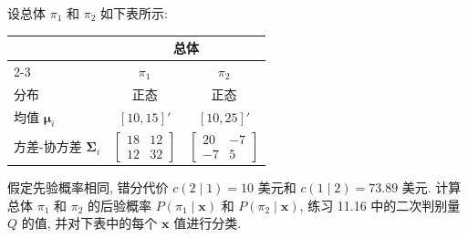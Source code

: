 \quad 设总体 $\pi_1$ 和 $\pi_2$ 如下表所示:

\begin{mvtable}
\begin{tabular}{lcc}
\toprule
& \multicolumn{2}{c}{总体}\\
\cmidrule(lr){2-3}
& $\pi_1$ & $\pi_2$\\
\midrule
分布 & 正态 & 正态\\
均值 $\boldsymbol{\mu}_i$ & $[10,15]'$ & $[10,25]'$\\
方差-协方差 $\boldsymbol{\Sigma}_i$ & $\begin{bmatrix}18&12\\12&32\end{bmatrix}$ & $\begin{bmatrix}20&-7\\-7&5\end{bmatrix}$\\
\bottomrule
\end{tabular}
\end{mvtable}

假定先验概率相同, 错分代价 $c(2\mid 1)=10$ 美元和 $c(1\mid 2)=73.89$ 美元. 计算总体 $\pi_1$ 和 $\pi_2$ 的后验概率 $P(\pi_1\mid \mathbf{x})$ 和 $P(\pi_2\mid \mathbf{x})$, 练习 11.16 中的二次判别量 $Q$ 的值, 并对下表中的每个 $\mathbf{x}$ 值进行分类.
